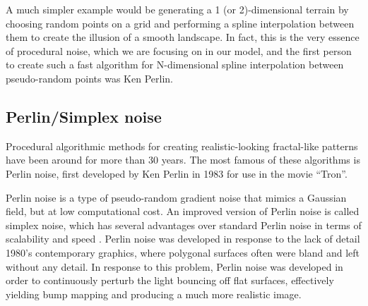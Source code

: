 \documentclass[aps,pre,twocolumn,letterpaper,floatfix,showpacs]{revtex4}
\begin{document}
A much simpler example would be generating a 1 (or 2)-dimensional terrain by choosing random points on a grid and performing a spline interpolation between them to create the illusion of a smooth landscape. In fact, this is the very essence of procedural noise, which we are focusing on in our model, and the first person to create such a fast algorithm for N-dimensional spline interpolation between pseudo-random points was Ken Perlin.   

\subsection{Perlin/Simplex noise}
\label{sec:perlin}

Procedural algorithmic methods for creating realistic-looking
fractal-like patterns have been around for more than 30 years. The most famous of these
algorithms is Perlin noise, first developed by Ken Perlin in 1983 for
use in the movie ``Tron''\cite{perlin1985image}. 

Perlin noise is a type of pseudo-random gradient noise that mimics a Gaussian field, but at low computational cost. An improved version of Perlin noise is called simplex noise, which has several advantages over standard Perlin noise in terms of scalability and speed \cite{perlin:2002}. Perlin noise was developed in response to the lack of detail 1980's contemporary graphics, where polygonal surfaces often were bland and left without any detail. In response to this problem, Perlin noise was developed in order to continuously perturb the light bouncing off flat surfaces, effectively yielding bump mapping and producing a much more realistic image. 
\end{document}
